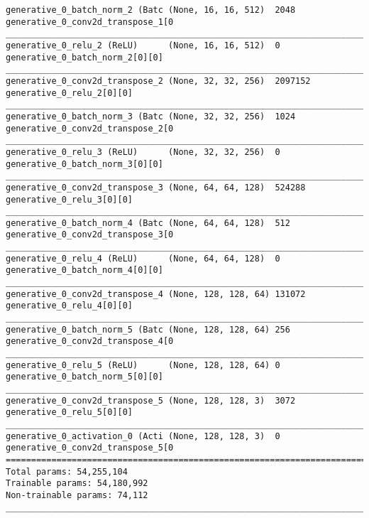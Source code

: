 \begin{lstlisting}[caption={CelebA-\ac{VLAE}-\ac{GAN} Decoder},captionpos=b,basicstyle=\tiny, label={lst:mnist-vlae-gan-decoder}]
generative_0_batch_norm_2 (Batc (None, 16, 16, 512)  2048        generative_0_conv2d_transpose_1[0
__________________________________________________________________________________________________
generative_0_relu_2 (ReLU)      (None, 16, 16, 512)  0           generative_0_batch_norm_2[0][0]
__________________________________________________________________________________________________
generative_0_conv2d_transpose_2 (None, 32, 32, 256)  2097152     generative_0_relu_2[0][0]
__________________________________________________________________________________________________
generative_0_batch_norm_3 (Batc (None, 32, 32, 256)  1024        generative_0_conv2d_transpose_2[0
__________________________________________________________________________________________________
generative_0_relu_3 (ReLU)      (None, 32, 32, 256)  0           generative_0_batch_norm_3[0][0]
__________________________________________________________________________________________________
generative_0_conv2d_transpose_3 (None, 64, 64, 128)  524288      generative_0_relu_3[0][0]
__________________________________________________________________________________________________
generative_0_batch_norm_4 (Batc (None, 64, 64, 128)  512         generative_0_conv2d_transpose_3[0
__________________________________________________________________________________________________
generative_0_relu_4 (ReLU)      (None, 64, 64, 128)  0           generative_0_batch_norm_4[0][0]
__________________________________________________________________________________________________
generative_0_conv2d_transpose_4 (None, 128, 128, 64) 131072      generative_0_relu_4[0][0]
__________________________________________________________________________________________________
generative_0_batch_norm_5 (Batc (None, 128, 128, 64) 256         generative_0_conv2d_transpose_4[0
__________________________________________________________________________________________________
generative_0_relu_5 (ReLU)      (None, 128, 128, 64) 0           generative_0_batch_norm_5[0][0]
__________________________________________________________________________________________________
generative_0_conv2d_transpose_5 (None, 128, 128, 3)  3072        generative_0_relu_5[0][0]
__________________________________________________________________________________________________
generative_0_activation_0 (Acti (None, 128, 128, 3)  0           generative_0_conv2d_transpose_5[0
==================================================================================================
Total params: 54,255,104
Trainable params: 54,180,992
Non-trainable params: 74,112
__________________________________________________________________________________________________
\end{lstlisting}